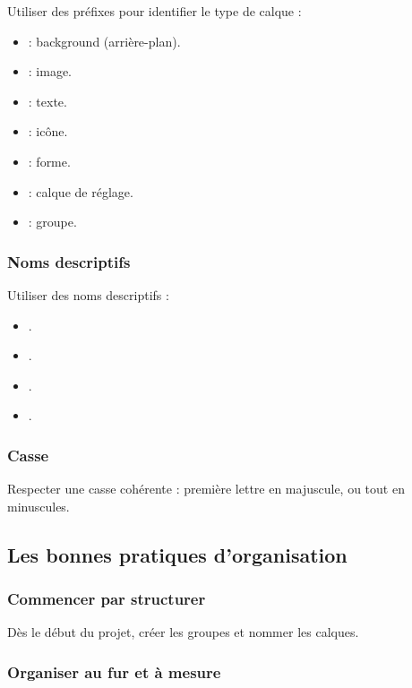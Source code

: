 Utiliser des préfixes pour identifier le type de calque :

\begin{itemize}
    \item {} : background (arrière-plan).
    \item {} : image.
    \item {} : texte.
    \item {} : icône.
    \item {} : forme.
    \item {} : calque de réglage.
    \item {} : groupe.
\end{itemize}

\subsubsection{Noms descriptifs}

Utiliser des noms descriptifs :

\begin{itemize}
    \item {}.
    \item {}.
    \item {}.
    \item {}.
\end{itemize}

\subsubsection{Casse}

Respecter une casse cohérente : première lettre en majuscule, ou tout en minuscules.

\subsection{Les bonnes pratiques d'organisation}

\subsubsection{Commencer par structurer}

Dès le début du projet, créer les groupes et nommer les calques.

\subsubsection{Organiser au fur et à mesure}


